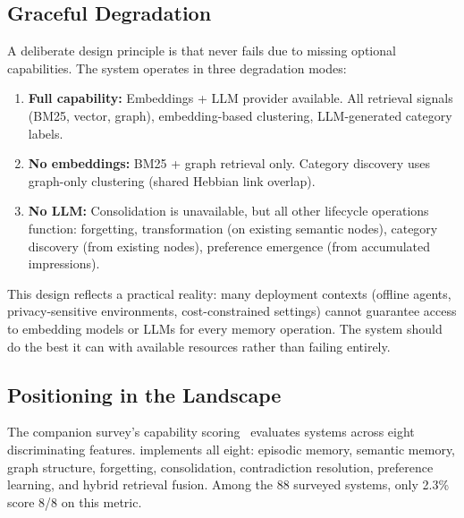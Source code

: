 \subsection{Graceful Degradation}

A deliberate design principle is that \alaya{} never fails due to missing
optional capabilities. The system operates in three degradation modes:

\begin{enumerate}[nosep]
    \item \textbf{Full capability:} Embeddings + LLM provider available.
    All retrieval signals (BM25, vector, graph), embedding-based clustering,
    LLM-generated category labels.
    \item \textbf{No embeddings:} BM25 + graph retrieval only. Category
    discovery uses graph-only clustering (shared Hebbian link overlap).
    \item \textbf{No LLM:} Consolidation is unavailable, but all other
    lifecycle operations function: forgetting, transformation (on existing
    semantic nodes), category discovery (from existing nodes), preference
    emergence (from accumulated impressions).
\end{enumerate}

This design reflects a practical reality: many deployment contexts
(offline agents, privacy-sensitive environments, cost-constrained settings)
cannot guarantee access to embedding models or LLMs for every memory
operation. The system should do the best it can with available resources
rather than failing entirely.

\subsection{Positioning in the Landscape}

The companion survey's capability scoring~\cite{hui2026taxonomy} evaluates
systems across eight discriminating features. \alaya{} implements all eight:
episodic memory, semantic memory, graph structure, forgetting,
consolidation, contradiction resolution, preference learning, and hybrid
retrieval fusion. Among the 88 surveyed systems, only 2.3\% score 8/8 on
this metric.

